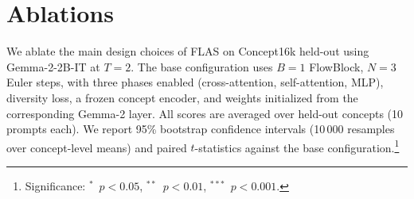 \documentclass{article}
\begin{document}
\section{Ablations}
\label{sec:ablations}

We ablate the main design choices of FLAS on Concept16k held-out using Gemma-2-2B-IT at $T\!=\!2$. The base configuration uses $B\!=\!1$ FlowBlock, $N\!=\!3$ Euler steps,  with three phases enabled (cross-attention, self-attention, MLP), diversity loss, a frozen concept encoder, and weights initialized from the corresponding Gemma-2 layer. All scores are averaged over held-out concepts (10 prompts each). We report 95\% bootstrap confidence intervals (10\,000 resamples over concept-level means) and paired $t$-statistics against the base configuration.\footnote{Significance: {$^{*}$}~$p < 0.05$, {$^{**}$}~$p < 0.01$, {$^{***}$}~$p < 0.001$.}
\end{document}
